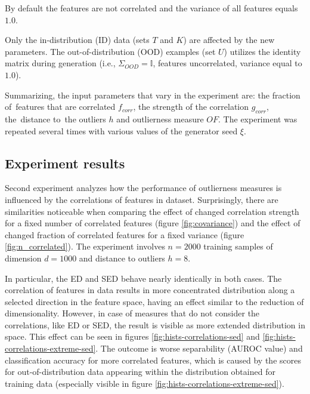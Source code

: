 By default the features are not correlated and the variance of all features equals $1.0$.

Only the in-distribution (ID) data (sets $T$ and $K$) are affected by the new parameters. The out-of-distribution (OOD) examples (set $U$) utilizes the identity matrix during generation (i.e., $\Sigma_{OOD} = \mathbb{I}$, features uncorrelated, variance equal to $1.0$).

Summarizing, the input parameters that vary in the experiment are: the fraction of~features that are correlated $f_{corr}$, the strength of the correlation $g_{corr}$, the~distance to~the outliers $h$ and outlierness measure $OF$. The experiment was repeated several times with various values of the generator seed $\xi$.


\subsection{Experiment results}
\label{section:correlations-results}

Second experiment analyzes how the performance of outlierness measures is influenced by the correlations of features in dataset. Surprisingly, there are similarities noticeable when comparing the effect of changed correlation strength for a fixed number of correlated features (figure \ref{fig:covariance}) and the effect of changed fraction of correlated features for a fixed variance (figure \ref{fig:n_correlated}). The experiment involves $n = 2000$ training samples of dimension $d = 1000$ and distance to outliers $h = 8$.

In particular, the ED and SED behave nearly identically in both cases. The correlation of features in data results in more concentrated distribution along a selected direction in the feature space, having an effect similar to the reduction of dimensionality. However, in case of measures that do not consider the correlations, like ED or SED, the result is visible as more extended distribution in space. This effect can be seen in figures \ref{fig:hists-correlations-sed} and \ref{fig:hists-correlations-extreme-sed}. The outcome is worse separability (AUROC value) and classification accuracy for more correlated features, which is caused by the scores for out-of-distribution data appearing within the distribution obtained for training data (especially visible in figure \ref{fig:hists-correlations-extreme-sed}).

